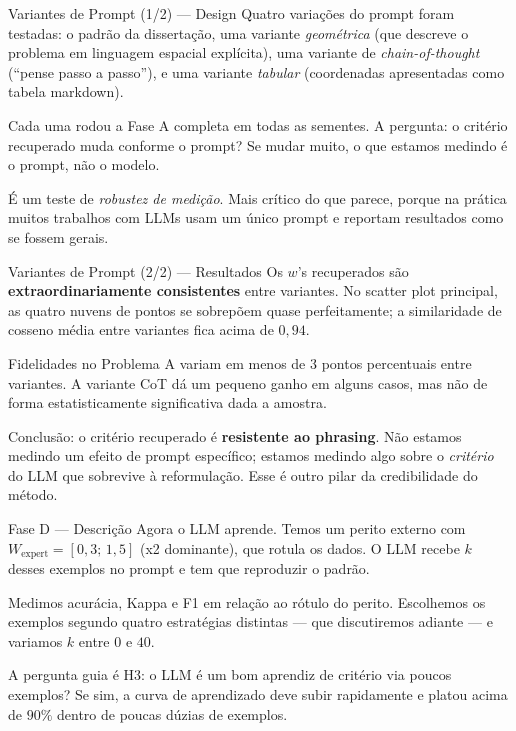 \documentclass[aspectratio=169,10pt]{beamer}
\begin{document}
\begin{frame}{Variantes de Prompt (1/2) --- Design}
  \small
  Quatro varia\c{c}\~oes do prompt foram testadas: o padr\~ao da disserta\c{c}\~ao, uma variante
  \emph{geom\'etrica} (que descreve o problema em linguagem espacial expl\'icita), uma variante de
  \emph{chain-of-thought} (``pense passo a passo''), e uma variante \emph{tabular} (coordenadas
  apresentadas como tabela markdown).
  \medskip

  Cada uma rodou a Fase A completa em todas as sementes. A pergunta: o crit\'erio recuperado muda
  conforme o prompt? Se mudar muito, o que estamos medindo \'e o prompt, n\~ao o modelo.
  \medskip

  \'E um teste de \emph{robustez de medi\c{c}\~ao}. Mais cr\'itico do que parece, porque na pr\'atica
  muitos trabalhos com LLMs usam um \'unico prompt e reportam resultados como se fossem gerais.
\end{frame}

\begin{frame}{Variantes de Prompt (2/2) --- Resultados}
  \small
  Os $w$'s recuperados s\~ao \textbf{extraordinariamente consistentes} entre variantes. No scatter plot
  principal, as quatro nuvens de pontos se sobrep\~oem quase perfeitamente; a similaridade de cosseno
  m\'edia entre variantes fica acima de $0{,}94$.
  \medskip

  Fidelidades no Problema A variam em menos de $3$ pontos percentuais entre variantes. A variante CoT
  d\'a um pequeno ganho em alguns casos, mas n\~ao de forma estatisticamente significativa dada a
  amostra.
  \medskip

  Conclus\~ao: o crit\'erio recuperado \'e \textbf{resistente ao phrasing}. N\~ao estamos medindo um
  efeito de prompt espec\'ifico; estamos medindo algo sobre o \emph{crit\'erio} do LLM que sobrevive \`a
  reformula\c{c}\~ao. Esse \'e outro pilar da credibilidade do m\'etodo.
\end{frame}

\begin{frame}{Fase D --- Descri\c{c}\~ao}
  \small
  Agora o LLM aprende. Temos um perito externo com $W_{\text{expert}} = [0{,}3;\,1{,}5]$ (x2 dominante),
  que rotula os dados. O LLM recebe $k$ desses exemplos no prompt e tem que reproduzir o padr\~ao.
  \medskip

  Medimos acur\'acia, Kappa e F1 em rela\c{c}\~ao ao r\'otulo do perito. Escolhemos os exemplos
  segundo quatro estrat\'egias distintas --- que discutiremos adiante --- e variamos $k$ entre $0$ e
  $40$.
  \medskip

  A pergunta guia \'e H3: o LLM \'e um bom aprendiz de crit\'erio via poucos exemplos? Se sim, a curva
  de aprendizado deve subir rapidamente e platou acima de $90\%$ dentro de poucas d\'uzias de exemplos.
\end{frame}
\end{document}
